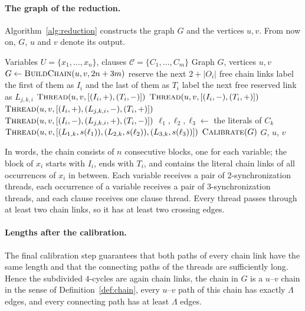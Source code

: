 \paragraph{The graph of the reduction.}
Algorithm~\ref{alg:reduction} constructs the graph $G$ and the vertices $u,v$.
From now on, $G$, $u$ and $v$ denote its output.

\begin{algorithm}[H]
\caption{Reduction from \ThreeSAT{} to \SSP}
\label{alg:reduction}
\begin{algorithmic}[1]
\Require Variables $U=\{x_1,\dots,x_n\}$, clauses $\mathcal{C}=\{C_1,\dots,C_m\}$
\Ensure Graph $G$, vertices $u,v$
\State $G \gets \textsc{BuildChain}(u,v,2n+3m)$
    \State reserve the next $2+|O_i|$ free chain links
    \State label the first of them as $I_i$ and the last of them as $T_i$
        \State label the next free reserved link as $L_{j,k,i}$
    \EndFor
\EndFor
{}
    \State $\textsc{Thread}(u,v,[(I_i,+),(T_i,-)])$
    \State $\textsc{Thread}(u,v,[(I_i,-),(T_i,+)])$
        \State $\textsc{Thread}(u,v,[(I_i,+),(L_{j,k,i},-),(T_i,+)])$
        \State $\textsc{Thread}(u,v,[(I_i,-),(L_{j,k,i},+),(T_i,-)])$
    \EndFor
\EndFor
{}
    \State $\ell_1,\ell_2,\ell_3 \gets$ the literals of $C_k$
    \State $\textsc{Thread}(u,v,[(L_{1,k},s(\ell_1)),(L_{2,k},s(\ell_2)),(L_{3,k},s(\ell_3))])$
\EndFor
\State $\textsc{Calibrate}(G)$
\State \Return $G$, $u$, $v$
\end{algorithmic}
\end{algorithm}

In words, the chain consists of $n$ consecutive blocks, one for each variable; the block of $x_i$ starts with $I_i$, ends with $T_i$, and contains the literal chain links of all occurrences of $x_i$ in between.
Each variable receives a pair of 2-synchronization threads, each occurrence of a variable receives a pair of 3-synchronization threads, and each clause receives one clause thread.
Every thread passes through at least two chain links, so it has at least two crossing edges.

\paragraph{Lengths after the calibration.}
The final calibration step guarantees that both paths of every chain link have the same length and that the connecting paths of the threads are sufficiently long.
Hence the subdivided $4$-cycles are again chain links, the chain in $G$ is a $u$--$v$ chain in the sense of Definition~\ref{def:chain}, every $u$--$v$ path of this chain has exactly $\Lambda$ edges, and every connecting path has at least $\Lambda$ edges.

